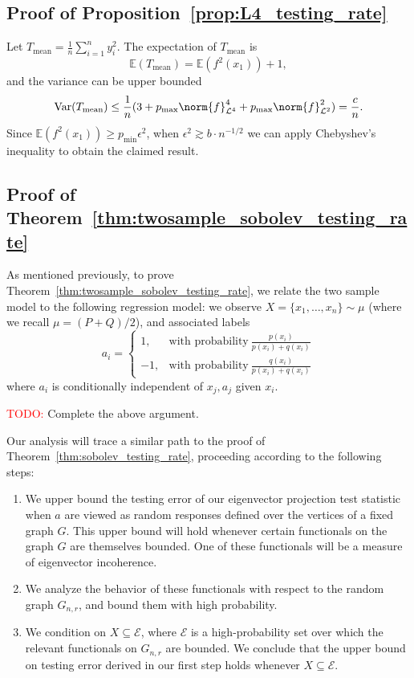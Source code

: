 \documentclass{article}
\newcommand{\Var}{\mathrm{Var}}
\newcommand{\1}{\mathbf{1}}
\newcommand{\Leb}{\mathcal{L}}
\newcommand{\Ebb}{\mathbb{E}}
\theoremstyle{alden}
\theoremstyle{aldenthm}
\theoremstyle{definition}
\theoremstyle{remark}
\begin{document}
\subsection{Proof of Proposition~\ref{prop:L4_testing_rate}}

Let $T_{\mathrm{mean}} = \frac{1}{n}\sum_{i = 1}^{n} y_i^2$. The expectation of $T_{\mathrm{mean}}$ is
\begin{equation*}
\Ebb(T_{\mathrm{mean}}) = \mathbb{E}(f^2(x_1)) + 1,
\end{equation*}
and the variance can be upper bounded
\begin{equation*}
\Var(T_{\mathrm{mean}}) \leq \frac{1}{n}(3 + p_{\max} \norm{f}_{\Leb^4}^4 + p_{\max}\norm{f}_{\Leb^2}^2) = \frac{c}{n}.
\end{equation*}
Since $\mathbb{E}(f^2(x_1)) \geq p_{\min} \epsilon^2$, when $\epsilon^2 \gtrsim b\cdot n^{-1/2}$ we can apply Chebyshev's inequality to obtain the claimed result.

\subsection{Proof of Theorem~\ref{thm:twosample_sobolev_testing_rate}}

As mentioned previously, to prove Theorem~\ref{thm:twosample_sobolev_testing_rate}, we relate the two sample model to the following regression model: we observe
$X = \{x_1,\ldots,x_n\} \sim \mu$ (where we recall $\mu = (P + Q)/2$), and associated labels
\begin{equation*}
a_i = 
\begin{cases}
1, & \textrm{with probability}~ \frac{p(x_i)}{p(x_i) + q(x_i)} \\
-1, & \textrm{with probability}~ \frac{q(x_i)}{p(x_i) + q(x_i)}
\end{cases}
\end{equation*}
where $a_i$ is conditionally independent of $x_j,a_j$ given $x_i$. 

\textcolor{red}{TODO:} Complete the above argument.

Our analysis will trace a similar path to the proof of Theorem~\ref{thm:sobolev_testing_rate}, proceeding according to the following steps:
\begin{enumerate}
	\item We upper bound the testing error of our eigenvector projection test statistic when $a$ are viewed as random responses defined over the vertices of a fixed graph $G$. This upper bound will hold whenever certain functionals on the graph $G$ are themselves bounded. One of these functionals will be a measure of eigenvector incoherence.
	\item We analyze the behavior of these functionals with respect to the random graph $G_{n,r}$, and bound them with high probability.
	\item We condition on $X \subseteq \mathcal{E}$, where $\mathcal{E}$ is a high-probability set over which the relevant functionals on $G_{n,r}$ are bounded. We conclude that the upper bound on testing error derived in our first step holds whenever $X \subseteq \mathcal{E}$. 
\end{enumerate}
\end{document}
